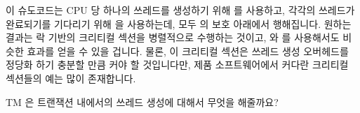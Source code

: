 이 슈도코드는 CPU 당 하나의 쓰레드를 생성하기 위해  를
사용하고, 각각의 쓰레드가 완료되기를 기다리기 위해  을
사용하는데, 모두  의 보호 아래에서 행해집니다.
원하는 결과는 락 기반의 크리티컬 섹션을 병렬적으로 수행하는 것이고, 
와  를 사용해서도 비슷한 효과를 얻을 수 있을 겁니다.
물론, 이 크리티컬 섹션은 쓰레드 생성 오버헤드를 정당화 하기 충분할 만큼 커야 할
것입니다만, 제품 소프트웨어에서 커다란 크리티컬 섹션들의 예는 많이 존재합니다.

TM 은 트랜잭션 내에서의 쓰레드 생성에 대해서 무엇을 해줄까요?

